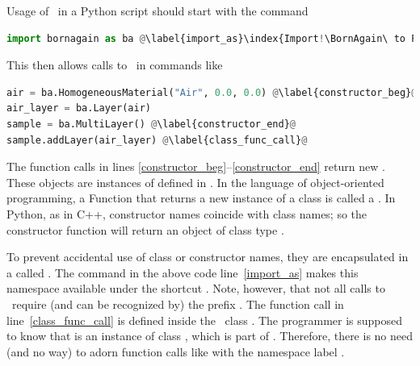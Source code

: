 Usage of \BornAgain\ in a Python script should start with the command
\begin{lstlisting}[language=python, style=eclipseboxed,name=ex1,nolol]
import bornagain as ba @\label{import_as}\index{Import!\BornAgain\ to Python|(}@
\end{lstlisting}
This then allows calls to \BornAgain\ in commands like
\pagebreak[2]
\begin{lstlisting}[language=python, style=eclipseboxed,name=ex1,nolol]
air = ba.HomogeneousMaterial("Air", 0.0, 0.0) @\label{constructor_beg}@
air_layer = ba.Layer(air)
sample = ba.MultiLayer() @\label{constructor_end}@
sample.addLayer(air_layer) @\label{class_func_call}@
\end{lstlisting}
The function calls in lines \ref{constructor_beg}--\ref{constructor_end}
return new .
These objects are instances of  defined in \BornAgain.
In the language of object-oriented programming,
a Function that returns a new instance of a class is called a .
In Python, as in C++, constructor names coincide with class names;
so the constructor function  will return an
object of class type .

To prevent accidental use of class or constructor names,
they are encapsulated in a 
called .
The  command in the above code line~\ref{import_as}
makes this namespace available under the shortcut .
Note, however, that not all calls to \BornAgain\ require
(and can be recognized by) the prefix .
The function call  in line~\ref{class_func_call}
is defined inside the \BornAgain\ class .
The programmer is supposed to know that  is an instance of
class , which is part of \BornAgain.
Therefore, there is no need (and no way) to adorn function calls like 
with the namespace label .

